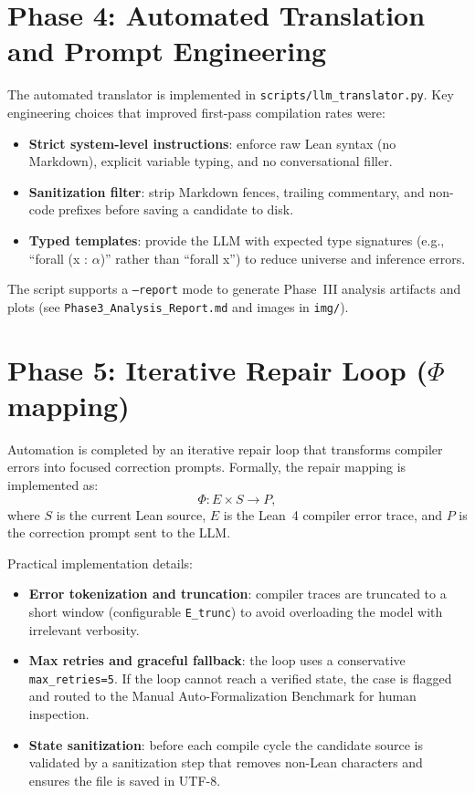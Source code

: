\section{Phase 4: Automated Translation and Prompt Engineering}
\label{sec:phase4-pipeline}

The automated translator is implemented in \texttt{scripts/llm\_translator.py}. Key engineering choices that improved first-pass compilation rates were:

\begin{itemize}
    \item \textbf{Strict system-level instructions}: enforce raw Lean syntax (no Markdown), explicit variable typing, and no conversational filler.
    \item \textbf{Sanitization filter}: strip Markdown fences, trailing commentary, and non-code prefixes before saving a candidate to disk.
    \item \textbf{Typed templates}: provide the LLM with expected type signatures (e.g., ``forall (x : $\alpha$)'' rather than ``forall x'') to reduce universe and inference errors.
\end{itemize}

The script supports a \texttt{--report} mode to generate Phase~III analysis artifacts and plots (see \texttt{Phase3\_Analysis\_Report.md} and images in \texttt{img/}).

\section{Phase 5: Iterative Repair Loop ($\Phi$ mapping)}
\label{sec:phase5-repair}

Automation is completed by an iterative repair loop that transforms compiler errors into focused correction prompts. Formally, the repair mapping is implemented as:
\[ \Phi : E \times S \to P, \]
where $S$ is the current Lean source, $E$ is the Lean~4 compiler error trace, and $P$ is the correction prompt sent to the LLM.

Practical implementation details:

\begin{itemize}
    \item \textbf{Error tokenization and truncation}: compiler traces are truncated to a short window (configurable \texttt{E\_trunc}) to avoid overloading the model with irrelevant verbosity.
    \item \textbf{Max retries and graceful fallback}: the loop uses a conservative \texttt{max\_retries=5}. If the loop cannot reach a verified state, the case is flagged and routed to the Manual Auto-Formalization Benchmark for human inspection.
    \item \textbf{State sanitization}: before each compile cycle the candidate source is validated by a sanitization step that removes non-Lean characters and ensures the file is saved in UTF-8.
\end{itemize}

